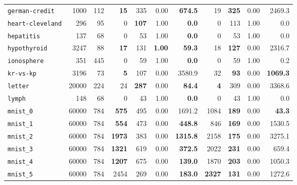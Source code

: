 \begin{tabular}{lccrrrrrrrr}
\texttt{german-credit} & \multicolumn{1}{r}{1000} & \multicolumn{1}{r}{112}  & \textbf{15} & 335 & 0.00 & \textbf{674.5} & 19 & \textbf{325} & 0.00 & 2469.3\\
\texttt{heart-cleveland} & \multicolumn{1}{r}{296} & \multicolumn{1}{r}{95}  & 0 & \textbf{107} & 1.00 & \textbf{0.0} & 0 & 113 & 1.00 & 0.0\\
\texttt{hepatitis} & \multicolumn{1}{r}{137} & \multicolumn{1}{r}{68}  & 0 & 53 & 1.00 & \textbf{0.0} & 0 & 53 & 1.00 & 0.0\\
\texttt{hypothyroid} & \multicolumn{1}{r}{3247} & \multicolumn{1}{r}{88}  & \textbf{17} & 131 & \textbf{1.00} & \textbf{59.3} & 18 & \textbf{127} & 0.00 & 2316.7\\
\texttt{ionosphere} & \multicolumn{1}{r}{351} & \multicolumn{1}{r}{445}  & 0 & 59 & 1.00 & \textbf{0.0} & 0 & 59 & 1.00 & 0.2\\
\texttt{kr-vs-kp} & \multicolumn{1}{r}{3196} & \multicolumn{1}{r}{73}  & \textbf{5} & 107 & 0.00 & 3580.9 & 32 & \textbf{93} & 0.00 & \textbf{1069.3}\\
\texttt{letter} & \multicolumn{1}{r}{20000} & \multicolumn{1}{r}{224}  & 24 & \textbf{287} & 0.00 & \textbf{84.4} & \textbf{4} & 309 & 0.00 & 3368.6\\
\texttt{lymph} & \multicolumn{1}{r}{148} & \multicolumn{1}{r}{68}  & 0 & 43 & 1.00 & \textbf{0.0} & 0 & 43 & 1.00 & 0.0\\
\texttt{mnist\_0} & \multicolumn{1}{r}{60000} & \multicolumn{1}{r}{784}  & \textbf{575} & 495 & 0.00 & 1691.2 & 1084 & \textbf{189} & 0.00 & \textbf{43.3}\\
\texttt{mnist\_1} & \multicolumn{1}{r}{60000} & \multicolumn{1}{r}{784}  & \textbf{554} & 473 & 0.00 & \textbf{448.8} & 846 & \textbf{169} & 0.00 & 1530.5\\
\texttt{mnist\_2} & \multicolumn{1}{r}{60000} & \multicolumn{1}{r}{784}  & \textbf{1973} & 383 & 0.00 & \textbf{1315.8} & 2158 & \textbf{175} & 0.00 & 3275.1\\
\texttt{mnist\_3} & \multicolumn{1}{r}{60000} & \multicolumn{1}{r}{784}  & \textbf{1321} & 619 & 0.00 & \textbf{372.5} & 2022 & \textbf{231} & 0.00 & 659.4\\
\texttt{mnist\_4} & \multicolumn{1}{r}{60000} & \multicolumn{1}{r}{784}  & \textbf{1207} & 675 & 0.00 & \textbf{139.0} & 1870 & \textbf{203} & 0.00 & 1050.3\\
\texttt{mnist\_5} & \multicolumn{1}{r}{60000} & \multicolumn{1}{r}{784}  & 2454 & 269 & 0.00 & \textbf{183.0} & \textbf{2327} & \textbf{131} & 0.00 & 1272.6\\

\end{tabular}
